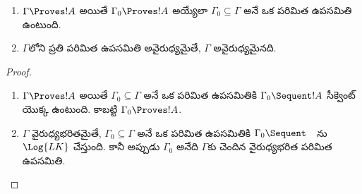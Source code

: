 \documentclass[../../../include/open-logic-section]{subfiles}
\begin{document}
\begin{prop}[సంహతత్వం]
  \begin{enumerate}
  \item $\Gamma \Proves !A$ అయితే $\Gamma_0 \Proves !A$ అయ్యేలా
    $\Gamma_0 \subseteq \Gamma$ అనే ఒక పరిమిత ఉపసమితి ఉంటుంది.
  \item $\Gamma$లోని ప్రతి పరిమిత ఉపసమితి అవైరుధ్యమైతే,
    $\Gamma$ అవైరుధ్యమైనది.
  \end{enumerate}
\end{prop}

\begin{proof}
  \begin{enumerate}
    \item $\Gamma \Proves !A$ అయితే $\Gamma_0 \subseteq \Gamma$ అనే
      ఒక పరిమిత ఉపసమితికి $\Gamma_0 \Sequent !A$ సీక్వెంట్ యొక్క
       ఉంటుంది. కాబట్టి $\Gamma_0 \Proves !A$.
    \item $\Gamma$ వైరుధ్యభరితమైతే, $\Gamma_0 \subseteq \Gamma$ అనే
      ఒక పరిమిత ఉపసమితికి $\Gamma_0 \Sequent \quad$ను $\Log{LK}$
       చేస్తుంది. కానీ అప్పుడు $\Gamma_0$ అనేది
      $\Gamma$కు చెందిన వైరుధ్యభరిత పరిమిత ఉపసమితి.
  \end{enumerate}
\end{proof}
\end{document}
